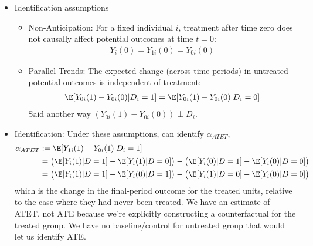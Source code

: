 \documentclass[12pt]{article}
\theoremstyle{plain}
\theoremstyle{definition}
\theoremstyle{remark}
\begin{document}
\begin{itemize}
\begin{itemize}
      \item
        Identification assumptions
        \begin{itemize}
          \item Non-Anticipation:
            For a fixed individual $i$, treatment after time zero does
            not causally affect potential outcomes at time $t=0$:
            \begin{align*}
              Y_i(0) = Y_{1i}(0) = Y_{0i}(0)
            \end{align*}
          \item Parallel Trends:
            The expected change (across time periods) in untreated
            potential outcomes is independent of treatment:
            \begin{align*}
              \E[Y_{0i}(1)-Y_{0i}(0)|D_i=1]
              =
              \E[Y_{0i}(1)-Y_{0i}(0)|D_i=0]
            \end{align*}
            Said another way $(Y_{0i}(1)-Y_{0i}(0))\perp D_i$.
        \end{itemize}
      \item Identification: Under these assumptions, can identify
        $\alpha_{ATET}$,
        \begin{align*}
          \alpha_{ATET}
          &:= \E[Y_{1i}(1)-Y_{0i}(1)|D_i=1]
          \\
          &=
          \big(
          \E[Y_i(1)|D=1]
          -
          \E[Y_i(1)|D=0]
          \big)
          -
          \big(
          \E[Y_i(0)|D=1]
          -
          \E[Y_i(0)|D=0]
          \big)
          \\
          &=
          \big(
          \E[Y_i(1)|D=1]
          -
          \E[Y_i(0)|D=1]
          \big)
          -
          \big(
          \E[Y_i(1)|D=0]
          -
          \E[Y_i(0)|D=0]
          \big)
        \end{align*}
        which is the change in the final-period outcome for the treated
        units, relative to the case where they had never been treated.
        We have an estimate of ATET, not ATE because we're explicitly
        constructing a counterfactual for the treated group. We have no
        baseline/control for untreated group that would let us
        identify ATE.


\end{itemize}
\end{itemize}
\end{document}
